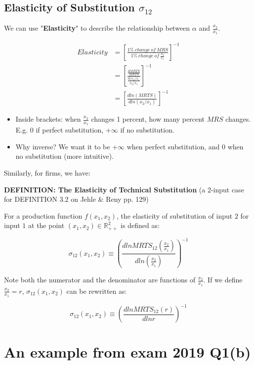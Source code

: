 \documentclass{article}
\newcommand{\R}{\mathbb{R}}
\begin{document}
\begin{mdframed}[backgroundcolor=blue!20,linecolor=white]
\section{Elasticity of Substitution $\sigma_{12}$}

We can use "\textbf{Elasticity}" to describe the relationship between $\alpha$ and $\frac{x_2}{x_1}$.

\begin{align*}
Elasticity &= [\frac{1\% \ change \  of \ MRS}{1\% \ change \ of \ \frac{x_2}{x_1}}]^{-1} \\
&= [\frac{\frac{d MRTS}{MRTS}}{\frac{d(x_2/x_1}{x_2/x_1}}]^{-1} \\
&= [\frac{d ln(MRTS)}{d ln(x_2/x_1)}]^{-1}
\end{align*}

\begin{itemize}
\item Inside brackets: when $\frac{x_2}{x_1}$ changes 1 percent, how many percent $MRS$ changes. E.g. $0$ if perfect substitution, $+\infty$ if no substitution.
\item Why inverse? We want it to be $+\infty$ when perfect substitution, and $0$ when no substitution (more intuitive).
\end{itemize}

Similarly, for firms, we have:

\textbf{DEFINITION: The Elasticity of Technical Substitution} (a 2-input case for DEFINITION 3.2 on Jehle \& Reny pp. 129)

\vspace{2mm}

For a production function $f(x_1,x_2)$, the elasticity of substitution of input $2$ for input $1$ at the
point $(x_1,x_2) \in \R^2_{++}$ is defined as:

$$\sigma_{12}(x_1,x_2) \equiv (\frac{d ln MRTS_{12}(\frac{x_2}{x_1})}{dln (\frac{x_2}{x_1})})^{-1}$$

Note both the numerator and the denominator are functions of $\frac{x_2}{x_1}$. If we define $\frac{x_2}{x_1} = r$,
$\sigma_{12}(x_1,x_2)$ can be rewritten as:

$$\sigma_{12}(x_1,x_2) \equiv (\frac{d ln MRTS_{12}(r)}{dln r})^{-1}$$

\end{mdframed}


\section*{An example from exam 2019 Q1(b)}
\end{document}
